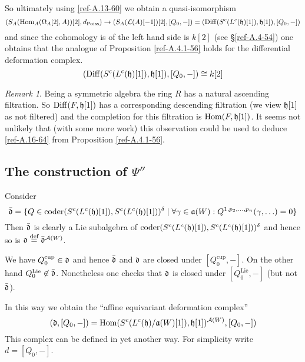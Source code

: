 \documentclass{amsart}
\numberwithin{equation}{section}
\let\cal\mathcal
\theoremstyle{definition}
\theoremstyle{remark}
\newtheorem{remarks}[lemmas]{Remark}
\begin{document}
So ultimately using \eqref{ref-A.13-60} we obtain a quasi-isomorphism
\[
(S_A({\operatorname {Hom}}_A(\Omega_A[2],A))[2],d_{\operatorname{Poiss}})\rightarrow (S_A({{\cal L}}(A)[-1])[2],[Q_0,-])=
 ({\operatorname{Diff}}(S^c(L^{c}(\frak{h})[1]),\frak{h}[1]),[Q_0,-])
\]
and since the cohomology is of the left hand side is $k[2]$ (see \S\ref{ref-A.4-54}) one obtains that the analogue of Proposition \ref{ref-A.4.1-56} holds
for the differential deformation complex. 
\begin{equation}
\label{ref-A.16-64}
({\operatorname{Diff}}(S^c(L^{c}(\frak{h})[1]),\frak{h}[1]),[Q_0,-])\cong k[2]
\end{equation}
\begin{remarks}   Being a symmetric algebra the ring $R$ has a
  natural ascending filtration. So ${\operatorname{Diff}}(F,\frak{h}[1])$ has a corresponding
  descending filtration (we view $\frak{h}[1]$ as not filtered) and the completion
for this filtration is ${\operatorname {Hom}}(F,\frak{h}[1])$. It seems not unlikely that (with some
more work) this
observation could be used to deduce
  \eqref{ref-A.16-64} from Proposition \ref{ref-A.4.1-56}.
\end{remarks}

\subsection{The construction of  $\Psi''$}
\label{ref-A.6-65}

Consider
\[
\bar{\frak{d}}=\{Q\in
{\operatorname{coder}}(S^c(L^c(\frak{h})[1]),S^c(L^c(\frak{h})[1]))^{\delta}
\mid
\forall \gamma\in {\mathfrak{a}}(W):Q^{1,p_2,\ldots,p_n}(\gamma,\ldots)=0\}
\]
Then $\bar{\frak{d}}$ is clearly a Lie subalgebra of
${\operatorname{coder}}(S^c(L^c(\frak{h})[1]),S^c(L^c(\frak{h})[1]))^{\delta}$ and
hence so is $\frak{d}\overset{\text{def}}{=}\bar{\frak{d}}^{{\operatorname{{\cal A}}}(W)}$.

We have $Q^{\text{cup}}_0\in \frak{d}$ and hence $\bar{\frak{d}}$ and $\frak{d}$ are closed
under $[Q^{\text{cup}}_0,-]$. On the other hand $Q^{\operatorname{Lie}}_0\not\in \bar{\frak{d}}$.
Nonetheless one checks that $\frak{d}$ is closed under $[Q^{\operatorname{Lie}}_0,-]$ (but
not $\bar{\frak{d}}$).

In this way we obtain the ``affine equivariant deformation complex''
\[
(\frak{d},[Q_0,-])={\operatorname {Hom}}(S^c(L^c(\frak{h})/{\mathfrak{a}}(W)[1]),\frak{h}[1])^{{\operatorname{{\cal A}}}(W)},[Q_0,-])
\]
This complex can be defined in yet another way. For simplicity write
$d=[Q_0,-]$.
\end{document}
